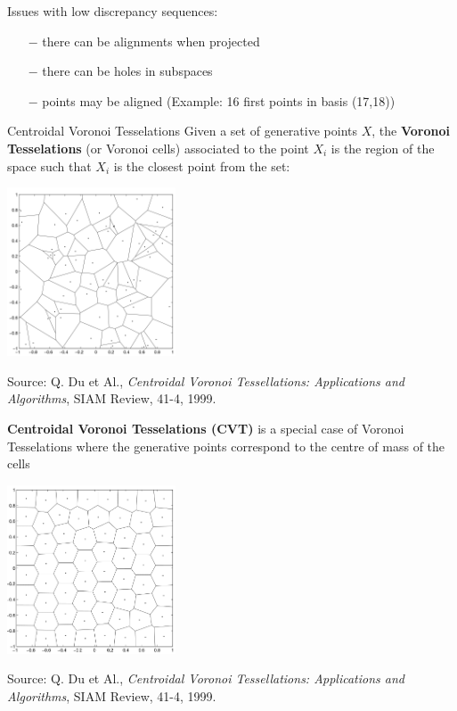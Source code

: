 \documentclass{beamer}
\begin{document}
\begin{frame}{}
Issues with low discrepancy sequences:
\begin{itemize}
	\item[$-$] there can be alignments when projected 
	\item[$-$] there can be holes in subspaces
	\item[$-$] points may be aligned (Example: 16 first points in basis (17,18))
\end{itemize}
\end{frame}

\begin{frame}{Centroidal Voronoi Tesselations}
Given a set of generative points $X$, the \textbf{Voronoi Tesselations} (or Voronoi cells) associated to the point $X_i$ is the region of the space such that $X_i$ is the closest point from the set:
\begin{center}
\includegraphics[height=5cm]{figures/VT}
\end{center}
Source: Q. Du et Al., \emph{Centroidal Voronoi Tessellations: Applications and Algorithms}, SIAM Review, 41-4, 1999.
\end{frame}

\begin{frame}{}
\textbf{Centroidal Voronoi Tesselations (CVT)} is a special case of Voronoi Tesselations where the generative points correspond to the centre of mass of the cells
\begin{center}
\includegraphics[height=5cm]{figures/CVT}
\end{center}
Source: Q. Du et Al., \emph{Centroidal Voronoi Tessellations: Applications and Algorithms}, SIAM Review, 41-4, 1999.
\end{frame}
\end{document}
